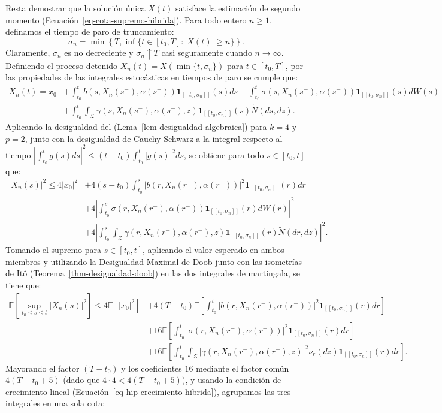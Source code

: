 \documentclass[
  spanish,
  us-letterpaper,
]{scrreprt}
\numberwithin{equation}{section}
\theoremstyle{plain}
\theoremstyle{plain}
\theoremstyle{plain}
\theoremstyle{definition}
\theoremstyle{remark}
\begin{document}
Resta demostrar que la solución única \(X(t)\) satisface la estimación
de segundo momento (Ecuación~\ref{eq-cota-supremo-hibrida}). Para todo
entero \(n \ge 1\), definamos el tiempo de paro de truncamiento: \[
\sigma_n = \min\left\{T, \inf\{t \in [t_0, T] : \vert X(t) \vert \ge n\}\right\}.
\] Claramente, \(\sigma_n\) es no decreciente y \(\sigma_n \uparrow T\)
casi seguramente cuando \(n \to \infty\). Definiendo el proceso detenido
\(X_n(t) = X(\min\{t, \sigma_n\})\) para \(t \in [t_0, T]\), por las
propiedades de las integrales estocásticas en tiempos de paro se cumple
que: \[
\begin{aligned}
X_n(t) = x_0 & + \int_{t_0}^t b(s, X_n(s^-), \alpha(s^-))\mathbf{1}_{[[t_0, \sigma_n]]}(s) ds + \int_{t_0}^t \sigma(s, X_n(s^-), \alpha(s^-))\mathbf{1}_{[[t_0, \sigma_n]]}(s) dW(s) \\
& + \int_{t_0}^t \int_{\mathcal{Z}} \gamma(s, X_n(s^-), \alpha(s^-), z)\mathbf{1}_{[[t_0, \sigma_n]]}(s) \tilde{N}(ds, dz).
\end{aligned}
\] Aplicando la desigualdad del (Lema~\ref{lem-desigualdad-algebraica})
para \(k = 4\) y \(p = 2\), junto con la desigualdad de Cauchy-Schwarz a
la integral respecto al tiempo
\(\displaystyle \left\vert \int_{t_0}^t g(s) ds \right\vert^2 \le (t - t_0)\int_{t_0}^t \vert g(s) \vert^2 ds\),
se obtiene para todo \(s \in [t_0, t]\) que: \[
\begin{aligned}
\vert X_n(s) \vert^2 \le 4\vert x_0 \vert^2 & + 4(s - t_0) \int_{t_0}^s \vert b(r, X_n(r^-), \alpha(r^-)) \vert^2 \mathbf{1}_{[[t_0, \sigma_n]]}(r) dr \\
& + 4\left\vert \int_{t_0}^s \sigma(r, X_n(r^-), \alpha(r^-))\mathbf{1}_{[[t_0, \sigma_n]]}(r) dW(r) \right\vert^2 \\
& + 4\left\vert \int_{t_0}^s \int_{\mathcal{Z}} \gamma(r, X_n(r^-), \alpha(r^-), z)\mathbf{1}_{[[t_0, \sigma_n]]}(r) \tilde{N}(dr, dz) \right\vert^2.
\end{aligned}
\] Tomando el supremo para \(s \in [t_0, t]\), aplicando el valor
esperado en ambos miembros y utilizando la Desigualdad Maximal de Doob
junto con las isometrías de Itô (Teorema~\ref{thm-desigualdad-doob}) en
las dos integrales de martingala, se tiene que: \[
\begin{aligned}
\mathbb{E}\left[ \sup_{t_0 \le s \le t} \vert X_n(s) \vert^2 \right] \le 4\mathbb{E}[\vert x_0 \vert^2] & + 4(T - t_0) \mathbb{E}\left[ \int_{t_0}^t \vert b(r, X_n(r^-), \alpha(r^-)) \vert^2 \mathbf{1}_{[[t_0, \sigma_n]]}(r) dr \right] \\
& + 16\mathbb{E}\left[ \int_{t_0}^t \vert \sigma(r, X_n(r^-), \alpha(r^-)) \vert^2 \mathbf{1}_{[[t_0, \sigma_n]]}(r) dr \right] \\
& + 16\mathbb{E}\left[ \int_{t_0}^t \int_{\mathcal{Z}} \vert \gamma(r, X_n(r^-), \alpha(r^-), z) \vert^2 \nu_r(dz) \mathbf{1}_{[[t_0, \sigma_n]]}(r) dr \right].
\end{aligned}
\] Mayorando el factor \((T - t_0)\) y los coeficientes \(16\) mediante
el factor común \(4(T - t_0 + 5)\) (dado que
\(4 \cdot 4 < 4(T - t_0 + 5)\)), y usando la condición de crecimiento
lineal (Ecuación~\ref{eq-hip-crecimiento-hibrida}), agrupamos las tres
integrales en una sola cota:
\end{document}
